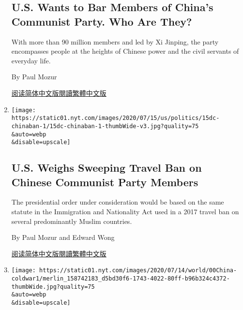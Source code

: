\begin{enumerate}
  \hypertarget{us-wants-to-bar-members-of-chinas-communist-party-who-are-they}{%
  \subsection{U.S. Wants to Bar Members of China's Communist Party. Who
  Are
  They?}\label{us-wants-to-bar-members-of-chinas-communist-party-who-are-they}}

  With more than 90 million members and led by Xi Jinping, the party
  encompasses people at the heights of Chinese power and the civil
  servants of everyday life.

  By Paul Mozur

  \href{https://cn.nytimes.com/usa/20200717/china-communist-party-travel-ban-explain/}{阅读简体中文版}\href{https://cn.nytimes.com/usa/20200717/china-communist-party-travel-ban-explain/zh-han}{閱讀繁體中文版}
\item
  \href{/2020/07/15/us/politics/china-travel-ban.html}{}

  \texttt{[image: https://static01.nyt.com/images/2020/07/15/us/politics/15dc-chinaban-1/15dc-chinaban-1-thumbWide-v3.jpg?quality=75\\\&auto=webp\\\&disable=upscale]}

  \hypertarget{us-weighs-sweeping-travel-ban-on-chinese-communist-party-members}{%
  \subsection{U.S. Weighs Sweeping Travel Ban on Chinese Communist Party
  Members}\label{us-weighs-sweeping-travel-ban-on-chinese-communist-party-members}}

  The presidential order under consideration would be based on the same
  statute in the Immigration and Nationality Act used in a 2017 travel
  ban on several predominantly Muslim countries.

  By Paul Mozur and Edward Wong

  \href{https://cn.nytimes.com/usa/20200716/china-travel-ban/}{阅读简体中文版}\href{https://cn.nytimes.com/usa/20200716/china-travel-ban/zh-hant/}{閱讀繁體中文版}
\item
  \href{/2020/07/14/world/asia/cold-war-china-us.html}{}

  \texttt{[image: https://static01.nyt.com/images/2020/07/14/world/00China-coldwar1/merlin\_158742183\_d5bd30f6-1743-4022-80ff-b96b324c4372-thumbWide.jpg?quality=75\\\&auto=webp\\\&disable=upscale]}

  \hypertarget{caught-in-ideological-spiral-us-and-china-drift-toward-cold-war}{%
}
\end{enumerate}
